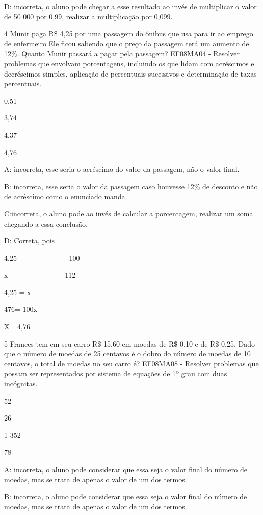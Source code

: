 D: incorreta, o aluno pode chegar a esse resultado ao invés de
multiplicar o valor de 50 000 por 0,99, realizar a multiplicação por
0,099.

\num{4} Munir paga R\$ 4,25 por uma passagem do ônibus que usa para ir ao
emprego de enfermeiro Ele ficou sabendo que o preço da passagem terá um
aumento de 12\%. Quanto Munir passará a pagar pela passagem? EF08MA04 -
Resolver problemas que envolvam porcentagens, incluindo os que lidam com
acréscimos e decréscimos simples, aplicação de percentuais sucessivos e
determinação de taxas percentuais.

\item 0,51
\item 3,74
\item 4,37
\item 4,76

A: incorreta, esse seria o acréscimo do valor da passagem, não o valor
final.

B: incorreta, esse seria o valor da passagem caso houvesse 12\% de
desconto e não de acréscimo como o enunciado manda.

C:incorreta, o aluno pode ao invés de calcular a porcentagem, realizar
um soma chegando a essa conclusão.

D: Correta, pois

4,25-\/-\/-\/-\/-\/-\/-\/-\/-\/-\/-\/-\/-\/-\/-\/-\/-\/-\/-\/-\/-\/-100

x-\/-\/-\/-\/-\/-\/-\/-\/-\/-\/-\/-\/-\/-\/-\/-\/-\/-\/-\/-\/-\/-\/-\/-112

4,25 = x

476= 100x

X= 4,76

\num{5} Frances tem em seu carro R\$ 15,60 em moedas de R\$ 0,10 e de R\$
0,25. Dado que o número de moedas de 25 centavos é o dobro do número de
moedas de 10 centavos, o total de moedas no seu carro é? EF08MA08 -
Resolver problemas que possam ser representados por sistema de equações
de 1º grau com duas incógnitas.

\item 52
\item 26
\item 1 352
\item 78

A: incorreta, o aluno pode considerar que essa seja o valor final do
número de moedas, mas se trata de apenas o valor de um dos termos.

B: incorreta, o aluno pode considerar que essa seja o valor final do
número de moedas, mas se trata de apenas o valor de um dos termos.

